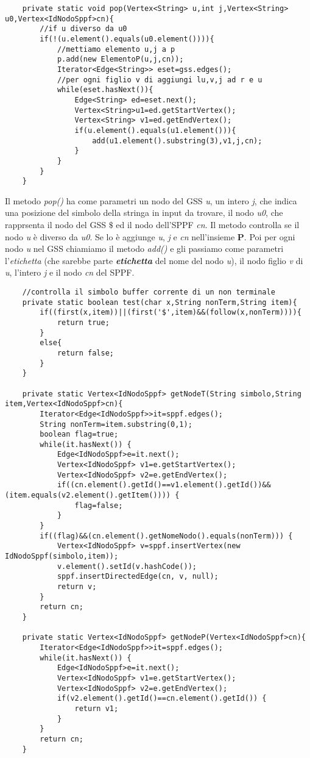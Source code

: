 \begin{lstlisting}
	private static void pop(Vertex<String> u,int j,Vertex<String> u0,Vertex<IdNodoSppf>cn){
		//if u diverso da u0
		if(!(u.element().equals(u0.element()))){
			//mettiamo elemento u,j a p
			p.add(new ElementoP(u,j,cn));
			Iterator<Edge<String>> eset=gss.edges();
			//per ogni figlio v di aggiungi lu,v,j ad r e u
			while(eset.hasNext()){
				Edge<String> ed=eset.next();
				Vertex<String>u1=ed.getStartVertex();
				Vertex<String> v1=ed.getEndVertex();
				if(u.element().equals(u1.element())){
					add(u1.element().substring(3),v1,j,cn);
				}
			}
		}
	}
\end{lstlisting}
Il metodo \textit{pop()} ha come parametri un nodo del GSS \textit{u}, un intero \textit{j}, che indica una posizione del simbolo della stringa in input da trovare, il nodo \textit{u0}, che rapprsenta il nodo del GSS $\$$ ed il nodo dell'SPPF \textit{cn}. Il metodo controlla se il nodo \textit{u} è diverso da \textit{u0}. Se lo è aggiunge \textit{u}, \textit{j} e \textit{cn} nell'insieme \textbf{P}. Poi per ogni nodo \textit{u} nel GSS chiamiamo il metodo \textit{add()} e gli passiamo come parametri l'\textit{etichetta} (che sarebbe parte \textit{\textbf{etichetta}} del nome del nodo \textit{u}), il nodo figlio \textit{v} di \textit{u}, l'intero \textit{j} e il nodo \textit{cn}  del SPPF.
\begin{lstlisting}
	//controlla il simbolo buffer corrente di un non terminale 
	private static boolean test(char x,String nonTerm,String item){
		if((first(x,item))||(first('$',item)&&(follow(x,nonTerm)))){
			return true;
		}
		else{
			return false;
		}
	}
	
	private static Vertex<IdNodoSppf> getNodeT(String simbolo,String item,Vertex<IdNodoSppf>cn){
		Iterator<Edge<IdNodoSppf>>it=sppf.edges();
		String nonTerm=item.substring(0,1);
		boolean flag=true;
		while(it.hasNext()) {
			Edge<IdNodoSppf>e=it.next();
			Vertex<IdNodoSppf> v1=e.getStartVertex();
			Vertex<IdNodoSppf> v2=e.getEndVertex();
			if((cn.element().getId()==v1.element().getId())&&(item.equals(v2.element().getItem()))) {
				flag=false;
			}
		}
		if((flag)&&(cn.element().getNomeNodo().equals(nonTerm))) {
			Vertex<IdNodoSppf> v=sppf.insertVertex(new IdNodoSppf(simbolo,item));
			v.element().setId(v.hashCode());
			sppf.insertDirectedEdge(cn, v, null);
			return v;
		}
		return cn;
	}
	
	private static Vertex<IdNodoSppf> getNodeP(Vertex<IdNodoSppf>cn){
		Iterator<Edge<IdNodoSppf>>it=sppf.edges();
		while(it.hasNext()) {
			Edge<IdNodoSppf>e=it.next();
			Vertex<IdNodoSppf> v1=e.getStartVertex();
			Vertex<IdNodoSppf> v2=e.getEndVertex();
			if(v2.element().getId()==cn.element().getId()) {
				return v1;
			}
		}
		return cn;
	}
	
\end{lstlisting}
